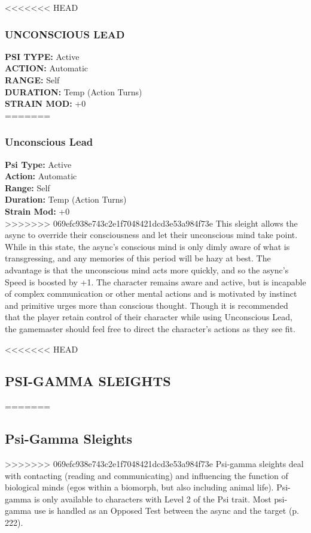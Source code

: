 <<<<<<< HEAD \subsubsection{UNCONSCIOUS LEAD} \textbf{PSI TYPE:} Active \\ \textbf{ACTION:} Automatic \\ \textbf{RANGE:} Self \\ \textbf{DURATION:} Temp (Action Turns) \\ \textbf{STRAIN MOD:} +0 \\ ======= \subsubsection{Unconscious Lead} \textbf{Psi Type:} Active \\ \textbf{Action:} Automatic \\ \textbf{Range:} Self \\ \textbf{Duration:} Temp (Action Turns) \\ \textbf{Strain Mod:} +0 \\ >>>>>>> 069efc938e743c2e1f7048421dcd3e53a984f73e This sleight allows the async to override their consciousness and let their unconscious mind take point. While in this state, the async’s conscious mind is only dimly aware of what is transgressing, and any memories of this period will be hazy at best. The advantage is that the unconscious mind acts more quickly, and so the async’s Speed is boosted by +1. The character remains aware and active, but is incapable of complex communication or other mental actions and is motivated by instinct and primitive urges more than conscious thought. Though it is recommended that the player retain control of their character while using Unconscious Lead, the gamemaster should feel free to direct the character’s actions as they see fit. 



<<<<<<< HEAD \subsection{PSI-GAMMA SLEIGHTS} ======= \subsection{Psi-Gamma Sleights} >>>>>>> 069efc938e743c2e1f7048421dcd3e53a984f73e Psi-gamma sleights deal with contacting (reading and communicating) and influencing the function of biological minds (egos within a biomorph, but also including animal life). Psi-gamma is only available to characters with Level 2 of the Psi trait. Most psi-gamma use is handled as an Opposed Test between the async and the target (p. 222). 


